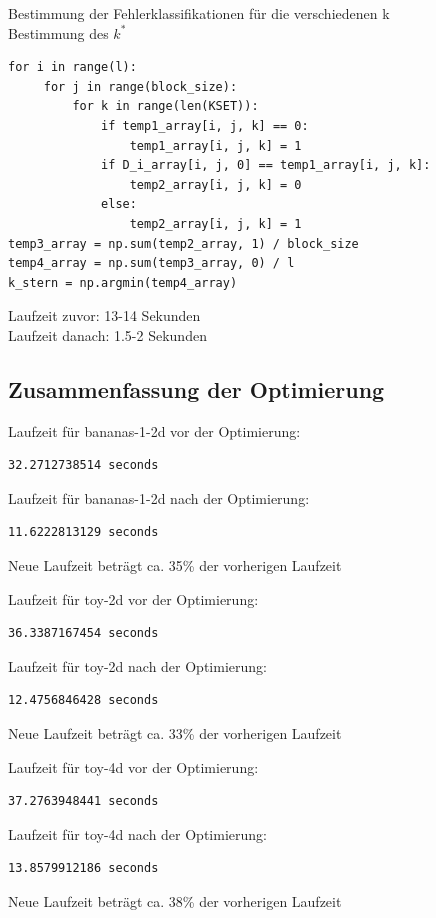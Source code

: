 \documentclass{beamer}
\begin{document}
\begin{frame}[fragile]
Bestimmung der Fehlerklassifikationen für die verschiedenen k\\
Bestimmung des $k^*$
\begin{verbatim}
for i in range(l):
     for j in range(block_size):
         for k in range(len(KSET)):
             if temp1_array[i, j, k] == 0:
                 temp1_array[i, j, k] = 1
             if D_i_array[i, j, 0] == temp1_array[i, j, k]:
                 temp2_array[i, j, k] = 0
             else:
                 temp2_array[i, j, k] = 1
temp3_array = np.sum(temp2_array, 1) / block_size
temp4_array = np.sum(temp3_array, 0) / l
k_stern = np.argmin(temp4_array)
\end{verbatim}
Laufzeit zuvor: 13-14 Sekunden\\
Laufzeit danach: 1.5-2 Sekunden
\end{frame}

\subsection{Zusammenfassung der Optimierung}
\begin{frame}[fragile]
Laufzeit für bananas-1-2d vor der Optimierung:
\begin{verbatim}
32.2712738514 seconds
\end{verbatim}
Laufzeit für bananas-1-2d nach der Optimierung:
\begin{verbatim}
11.6222813129 seconds
\end{verbatim}
Neue Laufzeit beträgt ca. 35\% der vorherigen Laufzeit
\end{frame}

\begin{frame}[fragile]
Laufzeit für toy-2d vor der Optimierung:
\begin{verbatim}
36.3387167454 seconds
\end{verbatim}
Laufzeit für toy-2d nach der Optimierung:
\begin{verbatim}
12.4756846428 seconds
\end{verbatim}
Neue Laufzeit beträgt ca. 33\% der vorherigen Laufzeit
\end{frame}

\begin{frame}[fragile]
Laufzeit für toy-4d vor der Optimierung:
\begin{verbatim}
37.2763948441 seconds
\end{verbatim}
Laufzeit für toy-4d nach der Optimierung:
\begin{verbatim}
13.8579912186 seconds
\end{verbatim}
Neue Laufzeit beträgt ca. 38\% der vorherigen Laufzeit
\end{frame}
\end{document}
